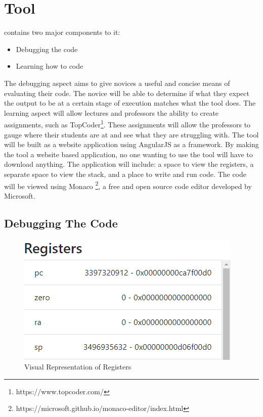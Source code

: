 






\section{Tool}
\tool{} contains two major components to it:
%
\begin{itemize}
\item 
Debugging the code
\item
Learning how to code
\end{itemize}
%
The debugging aspect aims to give novices a useful and concise means of evaluating their code.
%
The novice will be able to determine if what they expect the output to be at a certain stage of execution matches what the tool does.
%
The learning aspect will allow lectures and professors the ability to create assignments, such as TopCoder\footnote{https://www.topcoder.com/}.
%
These assignments will allow the professors to gauge where their students are at and see what they are struggling with.
%
The tool will be built as a website application using AngularJS as a framework.
%
By making the tool a website based application, no one wanting to use the tool will have to download anything.
%
The application will include: a space to view the registers, a separate space to view the stack, and a place to write and run code.
%
The code will be viewed using Monaco \footnote{https://microsoft.github.io/monaco-editor/index.html}, a free and open source code editor developed by Microsoft.



\subsection{Debugging The Code}

\begin{figure}[!t]
    \centering
    \vspace{-4pt}
    \includegraphics[scale=0.80]{figures/fig-registers.png}
    \caption{Visual Representation of Registers}
    \label{fig-registers}
\end{figure}

